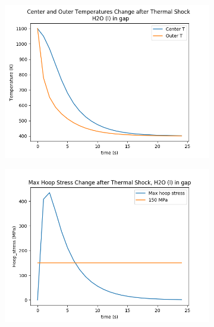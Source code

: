 \documentclass[12pt]{article}
\begin{document}
\begin{itemize}
\begin{figure}[h]
\begin{subfigure}[b]{0.4\textwidth}
        \caption{}
        \label{fig:tiger}
    \end{subfigure}
    ~ 
    \begin{subfigure}[b]{0.4\textwidth}
        \includegraphics[width=\textwidth]{thermalShock_H2O_T_vs_t.png}
        \caption{}
        \label{fig:t750}
    \end{subfigure}
        \begin{subfigure}[b]{0.4\textwidth}
        \includegraphics[width=\textwidth]{thermalShock_H2O_stress_vs_t.png}
        \caption{}
        \label{fig:t1000}
    \end{subfigure}

\end{figure}
\end{itemize}
\end{document}
